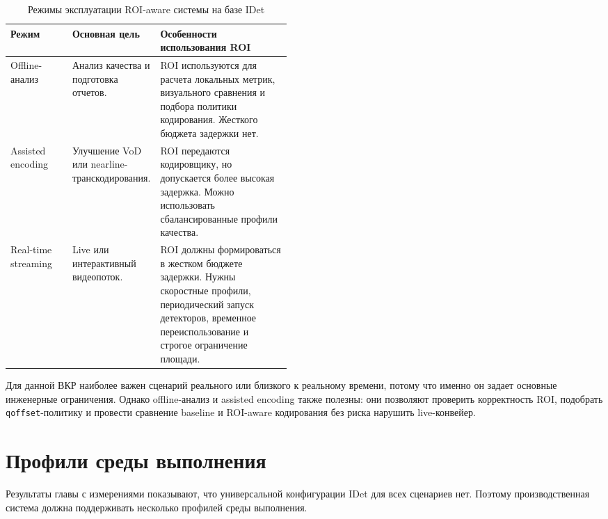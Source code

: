 \documentclass[12pt,a4paper,oneside,openany]{report}
\begin{document}
\begin{table}[H]\centering\caption{Режимы эксплуатации ROI-aware системы на базе IDet}\label{tab:deployment_modes}\small\begin{tabularx}{\linewidth}{@{}P{0.22\linewidth}P{0.25\linewidth}Y@{}}\toprule
Режим & Основная цель & Особенности использования ROI \\
\midrule
Offline-анализ & Анализ качества и подготовка отчетов. & ROI используются для расчета локальных метрик, визуального сравнения и подбора политики кодирования. Жесткого бюджета задержки нет. \\
Assisted encoding & Улучшение VoD или nearline-транскодирования. & ROI передаются кодировщику, но допускается более высокая задержка. Можно использовать сбалансированные профили качества. \\
Real-time streaming & Live или интерактивный видеопоток. & ROI должны формироваться в жестком бюджете задержки. Нужны скоростные профили, периодический запуск детекторов, временное переиспользование и строгое ограничение площади. \\
\bottomrule\end{tabularx}
\end{table}

Для данной ВКР наиболее важен сценарий реального или близкого к реальному времени, потому что именно он задает основные инженерные ограничения. Однако offline-анализ и assisted encoding также полезны: они позволяют проверить корректность ROI, подобрать \texttt{qoffset}-политику и провести сравнение baseline и ROI-aware кодирования без риска нарушить live-конвейер.


\section{Профили среды выполнения}

Результаты главы с измерениями показывают, что универсальной конфигурации IDet для всех сценариев нет. Поэтому производственная система должна поддерживать несколько профилей среды выполнения.
\end{document}

